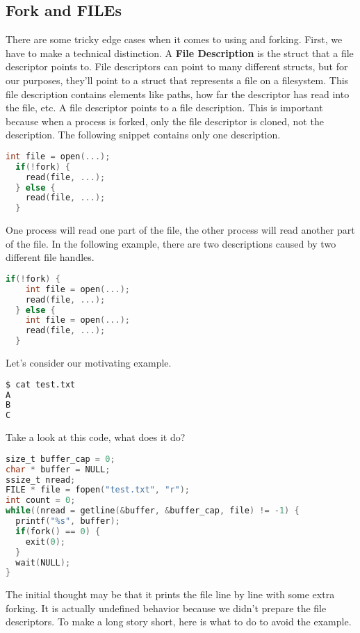 \subsection{Fork and FILEs}

There are some tricky edge cases when it comes to using  and forking.
First, we have to make a technical distinction.
A \textbf{File Description} is the struct that a file descriptor points to.
File descriptors can point to many different structs, but for our purposes, they'll point to a struct that represents a file on a filesystem.
This file description contains elements like paths, how far the descriptor has read into the file, etc.
A file descriptor points to a file description.
This is important because when a process is forked, only the file descriptor is cloned, not the description.
The following snippet contains only one description.

\begin{lstlisting}[language=C]
  int file = open(...);
  if(!fork) {
    read(file, ...);
  } else {
    read(file, ...);
  }
\end{lstlisting}

One process will read one part of the file, the other process will read another part of the file.
In the following example, there are two descriptions caused by two different file handles.

\begin{lstlisting}[language=C]
  if(!fork) {
    int file = open(...);
    read(file, ...);
  } else {
    int file = open(...);
    read(file, ...);
  }
\end{lstlisting}

Let's consider our motivating example.

\begin{lstlisting}[language=bash]
$ cat test.txt
A
B
C
\end{lstlisting}

Take a look at this code, what does it do?

\begin{lstlisting}[language=C]
size_t buffer_cap = 0;
char * buffer = NULL;
ssize_t nread;
FILE * file = fopen("test.txt", "r");
int count = 0;
while((nread = getline(&buffer, &buffer_cap, file) != -1) {
  printf("%s", buffer);
  if(fork() == 0) { 
    exit(0);
  }
  wait(NULL);
}
\end{lstlisting}

The initial thought may be that it prints the file line by line with some extra forking.
It is actually undefined behavior because we didn't prepare the file descriptors.
To make a long story short, here is what to do to avoid the example.


